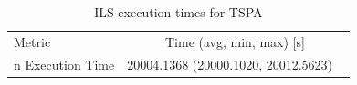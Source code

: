 \begin{table}[h!]
\centering
\begin{tabular}{lc}
\hline
Metric & Time (avg, min, max) [s] \\n\hline
Execution Time & 20004.1368 (20000.1020, 20012.5623) \
\hline
\end{tabular}
\caption{ILS execution times for TSPA}
\label{tab:TSPA_ils_timings}
\end{table}
